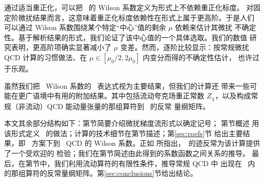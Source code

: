 通过适当重正化，可以把 \emt\ 的 Wilson 系数定义为形式上不依赖重正化标度。
对固定阶微扰结果而言，这意味着重正化标度依赖性在形式上属于更高阶。于是人们
可以通过 Wilson 系数围绕某个特定``中心''值的剩余 $\mu$ 依赖来估计其微扰
不确定性。基于解析结果的形式，我们论证了该中心值的一个具体选取。我们的数值
研究表明，更高阶项确实显著减小了 $\mu$ 变差。然而，逐阶比较显示：按常规微扰
QCD 计算的习惯做法、在 $\mu\in[\mu_0/2,2\mu_0]$ 内变分而得的不确定性估计，
也许过于乐观。

虽然我们把 \emt\ Wilson 系数的 \nnlo\ 表达式视为主要结果，但我们的计算还
带来一些可能在更广语境中有用的附加结果。其中包括流动夸克场重正常数
$Z_\chi$，以及构成常规（非流动）QCD 能动量张量的那组算符到 \nnlo\ 的反常
量纲矩阵。

本文其余部分结构如下：第节简要介绍微扰梯度流形式以确定记号；
第节概述  用该形式定义
\emt\ 的做法；计算的技术细节在第节描述；第\ref{sec:coefs}节
给出主要结果，即 \msbar\ 方案下到 \nnlo\ QCD 的 Wilson 系数。正如
 所指出，\emt\ 的迹反常为该计算提供了一个受欢迎的
检验；我们在第节简述由此得到的系数函数之间关系的推导。
最后，在第节中，我们利用流动算符的有限性条件，推导常规 QCD 中
出现在 \emt\ 内的那组算符的反常量纲矩阵。第\ref{sec:conclusions}节给出结论。
